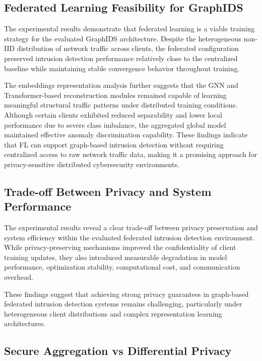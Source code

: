 \documentclass[conference]{IEEEtran}
\begin{document}
\subsection{Federated Learning Feasibility for GraphIDS}

The experimental results demonstrate that federated learning is a viable training strategy for the evaluated GraphIDS architecture. Despite the heterogeneous non-IID distribution of network traffic across clients, the federated configuration preserved intrusion detection performance relatively close to the centralized baseline while maintaining stable convergence behavior throughout training.

The embeddings representation analysis further suggests that the GNN and Transformer-based reconstruction modules remained capable of learning meaningful structural traffic patterns under distributed training conditions. Although certain clients exhibited reduced separability and lower local performance due to severe class imbalance, the aggregated global model maintained effective anomaly discrimination capability. These findings indicate that FL can support graph-based intrusion detection without requiring centralized access to raw network traffic data, making it a promising approach for privacy-sensitive distributed cybersecurity environments.

\subsection{Trade-off Between Privacy and System Performance}

The experimental results reveal a clear trade-off between privacy preservation and system efficiency within the evaluated federated intrusion detection environment. While privacy-preserving mechanisms improved the confidentiality of client training updates, they also introduced measurable degradation in model performance, optimization stability, computational cost, and communication overhead.

These findings suggest that achieving strong privacy guarantees in graph-based federated intrusion detection systems remains challenging, particularly under heterogeneous client distributions and complex representation learning architectures.

\subsection{Secure Aggregation vs Differential Privacy}
\end{document}
